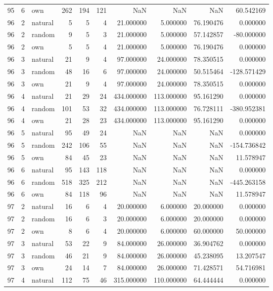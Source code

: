 \begin{table}[htbp]
\begin{tabular}{rrlrrrrrrr}
95 & 6 & own & 262 & 194 & 121 & NaN & NaN & NaN & 60.542169 \\
96 & 2 & natural & 5 & 5 & 4 & 21.000000 & 5.000000 & 76.190476 & 0.000000 \\
96 & 2 & random & 9 & 5 & 3 & 21.000000 & 5.000000 & 57.142857 & -80.000000 \\
96 & 2 & own & 5 & 5 & 4 & 21.000000 & 5.000000 & 76.190476 & 0.000000 \\
96 & 3 & natural & 21 & 9 & 4 & 97.000000 & 24.000000 & 78.350515 & 0.000000 \\
96 & 3 & random & 48 & 16 & 6 & 97.000000 & 24.000000 & 50.515464 & -128.571429 \\
96 & 3 & own & 21 & 9 & 4 & 97.000000 & 24.000000 & 78.350515 & 0.000000 \\
96 & 4 & natural & 21 & 29 & 24 & 434.000000 & 113.000000 & 95.161290 & 0.000000 \\
96 & 4 & random & 101 & 53 & 32 & 434.000000 & 113.000000 & 76.728111 & -380.952381 \\
96 & 4 & own & 21 & 28 & 23 & 434.000000 & 113.000000 & 95.161290 & 0.000000 \\
96 & 5 & natural & 95 & 49 & 24 & NaN & NaN & NaN & 0.000000 \\
96 & 5 & random & 242 & 106 & 55 & NaN & NaN & NaN & -154.736842 \\
96 & 5 & own & 84 & 45 & 23 & NaN & NaN & NaN & 11.578947 \\
96 & 6 & natural & 95 & 143 & 118 & NaN & NaN & NaN & 0.000000 \\
96 & 6 & random & 518 & 325 & 212 & NaN & NaN & NaN & -445.263158 \\
96 & 6 & own & 84 & 118 & 96 & NaN & NaN & NaN & 11.578947 \\
97 & 2 & natural & 16 & 6 & 4 & 20.000000 & 6.000000 & 20.000000 & 0.000000 \\
97 & 2 & random & 16 & 6 & 3 & 20.000000 & 6.000000 & 20.000000 & 0.000000 \\
97 & 2 & own & 8 & 6 & 4 & 20.000000 & 6.000000 & 60.000000 & 50.000000 \\
97 & 3 & natural & 53 & 22 & 9 & 84.000000 & 26.000000 & 36.904762 & 0.000000 \\
97 & 3 & random & 46 & 21 & 9 & 84.000000 & 26.000000 & 45.238095 & 13.207547 \\
97 & 3 & own & 24 & 14 & 7 & 84.000000 & 26.000000 & 71.428571 & 54.716981 \\
97 & 4 & natural & 112 & 75 & 46 & 315.000000 & 110.000000 & 64.444444 & 0.000000 \\

\end{tabular}
\end{table}
